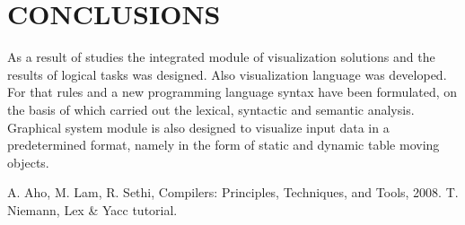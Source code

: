 \documentclass[a4paper, 10pt, conference]{ieeeconf}
\begin{document}
\section{CONCLUSIONS}

As a result of studies the integrated module of visualization solutions and the results of logical tasks was designed. Also visualization language was developed. For that rules and  a new programming language syntax  have been formulated, on the basis of which carried out the lexical, syntactic and semantic analysis. Graphical system module is also designed to visualize input data in a predetermined format, namely in the form of static and dynamic table moving objects.   

\addtolength{\textheight}{-12cm}

\begin{thebibliography}{99}

 A. Aho, M. Lam, R. Sethi, Compilers: Principles, Techniques, and Tools, 2008.
 T. Niemann, Lex \& Yacc tutorial.

\end{thebibliography}
\end{document}
